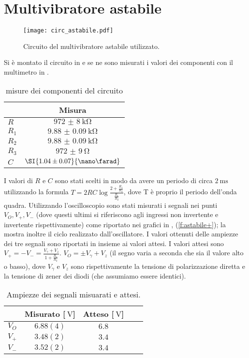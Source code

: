 \section{Multivibratore astabile}
\begin{figure}[h]
	\centering
	\texttt{[image: circ\_astabile.pdf]}
	\caption{Circuito del multivibratore astabile utilizzato.}
	\label{f:multi_vibr}
\end{figure}
Si è montato il circuito in  e se ne sono misurati i valori dei componenti con il multimetro in .
\begin{table}
	\centering
	\begin{tabular}{lc}
		& Misura \\
		\midrule
	$R$	&$\SI{972(8)}{\kohm}$\\
	 $R_1$	&$\SI{9.88(9)}{\kohm}$\\
	 $R_2$	&$\SI{9.88(9)}{\kohm}$\\
	 $R_3$	&$\SI{972(9)}{\ohm}$\\
	 $C$	&$\SI{1.04 \pm 0.07}{\nano\farad}$ \\
	\end{tabular}
	\caption{misure dei componenti del circuito}
	\label{t:misure_componenti}
\end{table}
I valori di $R$ e $C$ sono stati scelti in modo da avere un periodo di circa $\SI{2}{\ms}$ utilizzando la formula $T=2RC\log\frac{2+\frac{R_1}{R_2}}{\frac{R_1}{R_2}}$, dove T è proprio il periodo dell'onda quadra. Utilizzando l'oscilloscopio sono stati misurati i segnali nei punti $V_O , V_+ ,V_-$ (dove questi ultimi si riferiscono agli ingressi non invertente e invertente rispettivamente) come riportato nei grafici in , (\ref{f:astabile+}); la  mostra inoltre il ciclo realizzato dall'oscillatore.
I valori ottenuti delle ampiezze dei tre segnali sono riportati in  insieme ai valori attesi.
I valori attesi sono $V_+=-V_-=\frac{V_\gamma +V_z}{1+\frac{R_1}{R_2}}$.  $V_O=\pm V_\gamma +V_z$ (il segno varia a seconda che sia il valore alto o basso), dove $V_\gamma$ e $V_z$ sono rispettivamente la tensione di polarizzazione diretta e la tensione di zener dei diodi (che assumiamo essere identici).
\begin{table}[h]
	\centering
	\begin{tabular}{lcccc}
	&Misurato [$\SI{}{\V}$]&Atteso [$\SI{}{\V}$] \\
	\midrule
	$V_O$	& $6.88(4)$	& $6.8$ \\
	$V_+$	& $3.48(2)$	& $3.4$ \\
	$V_-$	& $3.52(2)$	& $3.4$ \\
	\end{tabular}
	\caption{Ampiezze dei segnali misuarati e attesi.}
	\label{t:misure}
\end{table}


